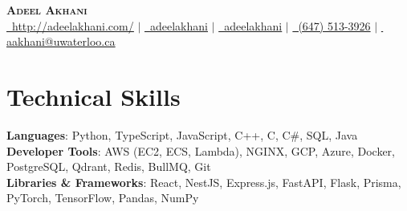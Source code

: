 \documentclass[letterpaper,11pt]{article}
\begin{document}
\begin{center}
    \textbf{\Huge \scshape Adeel Akhani} \\ \vspace{1pt}
    \small
    \href{http://adeelakhani.com/}{\faGlobe\, \underline{http://adeelakhani.com/}} $|$
    \href{https://www.linkedin.com/in/adeelakhani/}{\faLinkedin\, \underline{adeelakhani}} $|$ 
    \href{https://github.com/adeelakhani}{\faGithub\, \underline{adeelakhani}} $|$
    \href{tel:(647) 513-3926}{\faMobile*\, (647) 513-3926} $|$
    \href{mailto:aakhani@uwaterloo.ca}{\faEnvelope\, \underline{aakhani@uwaterloo.ca}}
\end{center}
\section{Technical Skills}
\begin{itemize}[leftmargin=0.15in, label={}]
    \small{\item{
    \textbf{Languages}{: Python, TypeScript, JavaScript, C++, C, C\#, SQL, Java} \\
    \textbf{Developer Tools}{: AWS (EC2, ECS, Lambda), NGINX, GCP, Azure, Docker, PostgreSQL, Qdrant, Redis, BullMQ, Git} \\
    \textbf{Libraries \& Frameworks}{: React, NestJS, Express.js, FastAPI, Flask, Prisma, PyTorch, TensorFlow, Pandas, NumPy} 
    }}
\end{itemize}
\end{document}
